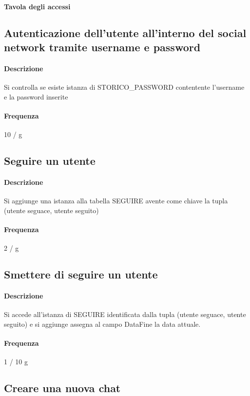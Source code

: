 \documentclass[a4paper,12pt]{report}
\begin{document}
\paragraph{Tavola degli accessi}

\subsection{Autenticazione dell'utente all'interno del social network tramite username e password}
\paragraph{Descrizione} Si controlla se esiste istanza di STORICO\_PASSWORD contentente l'username e la password inserite
\paragraph{Frequenza} 10 / g

\subsection{Seguire un utente} 
\paragraph{Descrizione} Si aggiunge una istanza alla tabella SEGUIRE avente come chiave la tupla (utente seguace, utente seguito)
\paragraph{Frequenza} 2 / g

\subsection{Smettere di seguire un utente}
\paragraph{Descrizione} Si accede all'istanza di SEGUIRE identificata dalla tupla (utente seguace, utente seguito) e si aggiunge assegna al campo DataFine la data attuale.
\paragraph{Frequenza} 1 / 10 g

\subsection{Creare una nuova chat}
\end{document}
